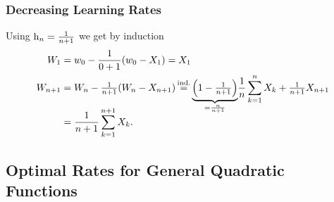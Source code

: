 \subsubsection{Decreasing Learning Rates}

Using \(\text{h}_n=\frac1{n+1}\) we get by induction
\begin{align}
	\label{eq: getting rid of w_0 first step}
	\Weights_1 &= \weights_0 - \frac{1}{0+1}(\weights_0 - X_1) = X_1\\
	\label{eq: telescoping product}
	\Weights_{n+1}
	&= \Weights_n - \tfrac{1}{n+1}(\Weights_n - X_{n+1})
	\xeq{\text{ind.}}\smash{\underbrace{\left(1-\tfrac1{n+1}\right)}_{=\frac{n}{n+1}}}
	\frac1n\sum_{k=1}^n X_k + \tfrac{1}{n+1}X_{n+1}\\
	\nonumber
	&= \frac{1}{n+1}\sum_{k=1}^{n+1}X_k.
\end{align}

\subsection{Optimal Rates for General Quadratic Functions}

